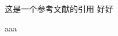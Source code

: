 \documentclass{ctexart}
\begin{document}


这是一个参考文献的引用\cite{hufflen2006names} 
好好\cite{mittelbach2004} 
    
    \nocite{*}
    
    aaa
    
    
\end{document}
